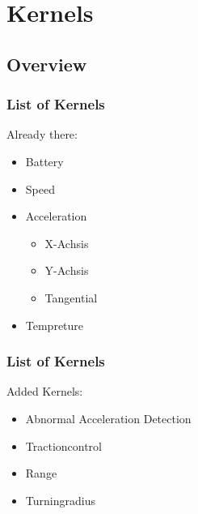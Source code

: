\documentclass{beamer}
\begin{document}
\section{Kernels}
\subsection{Overview}
\begin{frame} %
  \frametitle{List of Kernels} %
  Already there:
  \begin{itemize}
   \item Battery
   \item Speed
   \item Acceleration
   \begin{itemize}
    \item X-Achsis
    \item Y-Achsis
    \item Tangential
   \end{itemize}
   \item Tempreture
  \end{itemize}
\end{frame}
\begin{frame}
    \frametitle{List of Kernels}
    Added Kernels:
    \begin{itemize}
     \item Abnormal Acceleration Detection
     \item Tractioncontrol
     \item Range
     \item Turningradius
    \end{itemize}
\end{frame}
\end{document}
